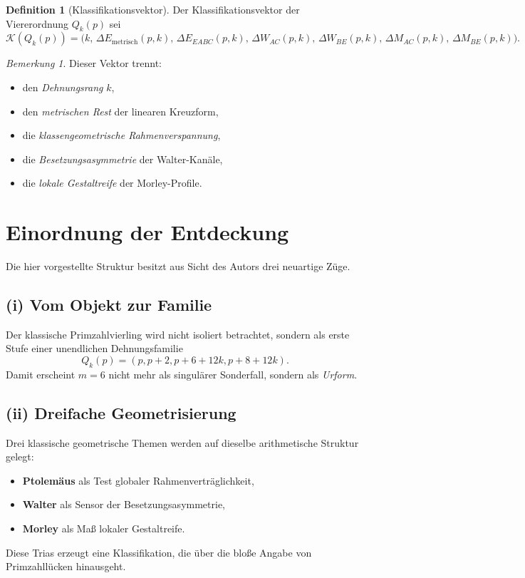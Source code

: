 \documentclass[11pt,a4paper]{article}
\theoremstyle{definition}
\newtheorem{definition}[satz]{Definition}
\theoremstyle{remark}
\newtheorem{bemerkung}[satz]{Bemerkung}
\begin{document}
\begin{definition}[Klassifikationsvektor]
Der Klassifikationsvektor der Viererordnung $Q_k(p)$ sei
\[
\mathcal K(Q_k(p))
=
\bigl(
k,\,
\Delta E_{\mathrm{metrisch}}(p,k),\,
\Delta E_{EABC}(p,k),\,
\Delta W_{AC}(p,k),\,
\Delta W_{BE}(p,k),\,
\Delta M_{AC}(p,k),\,
\Delta M_{BE}(p,k)
\bigr).
\]
\end{definition}

\begin{bemerkung}
Dieser Vektor trennt:
\begin{itemize}
\item den \emph{Dehnungsrang} $k$,
\item den \emph{metrischen Rest} der linearen Kreuzform,
\item die \emph{klassengeometrische Rahmenverspannung},
\item die \emph{Besetzungsasymmetrie} der Walter-Kanäle,
\item die \emph{lokale Gestaltreife} der Morley-Profile.
\end{itemize}
\end{bemerkung}

\section{Einordnung der Entdeckung}

Die hier vorgestellte Struktur besitzt aus Sicht des Autors drei neuartige Züge.

\subsection*{(i) Vom Objekt zur Familie}
Der klassische Primzahlvierling wird nicht isoliert betrachtet, sondern als erste Stufe einer unendlichen Dehnungsfamilie
\[
Q_k(p)=(p,p+2,p+6+12k,p+8+12k).
\]
Damit erscheint $m=6$ nicht mehr als singulärer Sonderfall, sondern als \emph{Urform}.

\subsection*{(ii) Dreifache Geometrisierung}
Drei klassische geometrische Themen werden auf dieselbe arithmetische Struktur gelegt:
\begin{itemize}
\item \textbf{Ptolemäus} als Test globaler Rahmenverträglichkeit,
\item \textbf{Walter} als Sensor der Besetzungsasymmetrie,
\item \textbf{Morley} als Maß lokaler Gestaltreife.
\end{itemize}
Diese Trias erzeugt eine Klassifikation, die über die bloße Angabe von Primzahllücken hinausgeht.
\end{document}
